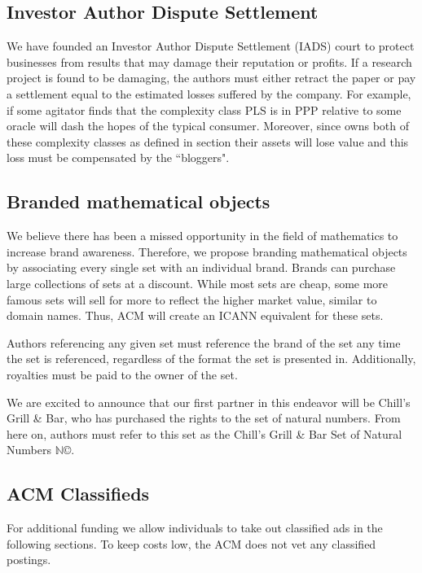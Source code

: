 \subsection{Investor Author Dispute Settlement}
We have founded an Investor Author Dispute Settlement (IADS) court to protect
businesses from results that may damage their reputation or profits.
If a research project is found to be damaging, the authors must either retract
the paper or pay a settlement equal to the estimated losses suffered by the
company.
For example, if some agitator finds that the complexity class PLS is in PPP
relative to some oracle will dash the hopes of the typical 
consumer.
Moreover, since  owns both of these complexity classes as defined
in section  their assets will lose value and
this loss must be compensated by the ``bloggers".


\subsection{Branded mathematical objects}
We believe there has been a missed opportunity in the field of mathematics to
increase brand awareness.
Therefore, we propose branding mathematical objects by associating every single
set with an individual brand.
Brands can purchase large collections of sets at a discount.
While most sets are cheap, some more famous sets will sell for more to reflect
the higher market value, similar to domain names.
Thus, ACM will create an ICANN equivalent for these sets.

Authors referencing any given set must reference the brand of the set any time
the set is referenced, regardless of the format the set is presented  in.
Additionally, royalties must be paid to the owner of the set.

We are excited to announce that our first partner in this endeavor will be
Chill's Grill \& Bar, who has purchased the rights to the set of natural
numbers.
From here on, authors must refer to this set as the Chill's Grill \& Bar Set of
Natural Numbers \(\mathbb{N}\)\copyright.

\subsection{ACM Classifieds}
For additional funding we allow individuals to take out classified ads in the
following sections.
To keep costs low, the ACM does not vet any classified postings.

